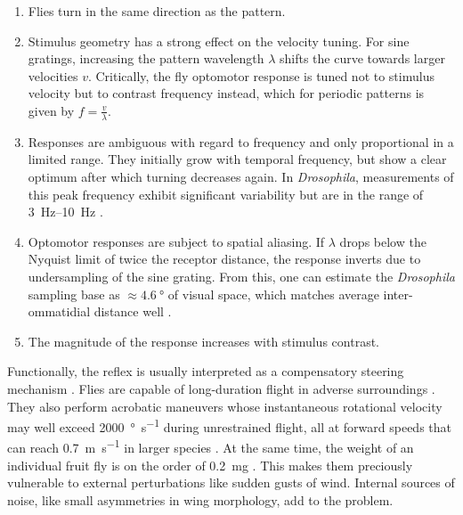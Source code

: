 \begin{enumerate}
    \item Flies turn in the same direction as the pattern.
    \item Stimulus geometry has a strong effect on the velocity tuning. For sine gratings, increasing the pattern wavelength $\lambda$ shifts the curve towards larger velocities $v$. Critically, the fly optomotor response is tuned not to stimulus velocity but to contrast frequency instead, which for periodic patterns is given by $f = \frac{v}{\lambda}$.
    \item Responses are ambiguous with regard to frequency and only proportional in a limited range. They initially grow with temporal frequency, but show a clear optimum after which turning decreases again. In \textit{Drosophila}, measurements of this peak frequency exhibit significant variability but are in the range of \SIrange{3}{10}{\hertz} \citep{Goetz:1973aa,Duistermars:2007aa}.
    \item Optomotor responses are subject to spatial aliasing. If $\lambda$ drops below the Nyquist limit of twice the receptor distance, the response inverts due to undersampling of the sine grating. From this, one can estimate the \textit{Drosophila} sampling base as $\approx \SI{4.6}{\degree}$ of visual space, which matches average inter-ommatidial distance well \citep{Gotz:1964bj}.
    \item The magnitude of the response increases with stimulus contrast.
\end{enumerate}


Functionally, the reflex is usually interpreted as a compensatory steering mechanism \citep{Heisenberg:1984aa}. Flies are capable of long-duration flight in adverse surroundings \citep{Goetz:1987aa,Dickinson:2014aa}. They also perform acrobatic maneuvers whose instantaneous rotational velocity may well exceed \SI{2000}{\degree\per\second} during unrestrained flight, all at forward speeds that can reach \SI{0.7}{\metre\per\second} in larger species \citep{Land:1974dp,Mronz:2008eb}. At the same time, the weight of an individual fruit fly is on the order of \SI{0.2}{\milli\gram} \citep{Seiger:1966a}. This makes them preciously vulnerable to external perturbations like sudden gusts of wind. Internal sources of noise, like small asymmetries in wing morphology, add to the problem.


